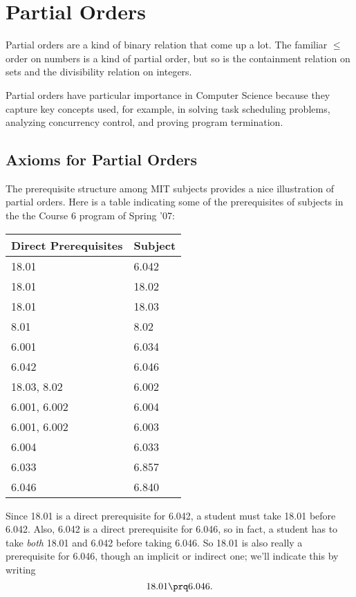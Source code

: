
\chapter{Partial Orders}


Partial orders are a kind of binary relation that come up a lot.  The
familiar $\leq$ order on numbers is a kind of partial order, but so is the
containment relation on sets and the divisibility relation on integers.

Partial orders have particular importance in Computer Science because they
capture key concepts used, for example, in solving task scheduling
problems, analyzing concurrency control, and proving program termination.

\section{Axioms for Partial Orders}

The prerequisite structure among MIT subjects provides a nice illustration
of partial orders.  Here is a table indicating some of the prerequisites of
subjects in the the Course 6 program of Spring '07:
\begin{center}
\begin{tabular}{|l|l|}
\hline
Direct Prerequisites & Subject\\ \hline
18.01 & 6.042\\ \hline
 18.01 & 18.02\\ \hline
 18.01 & 18.03\\ \hline
 8.01 & 8.02\\ \hline
 6.001 & 6.034\\ \hline
 6.042 & 6.046\\ \hline
 18.03, 8.02 & 6.002\\ \hline
 6.001, 6.002 & 6.004\\ \hline
 6.001, 6.002 & 6.003\\ \hline
 6.004 & 6.033\\ \hline
 6.033 & 6.857\\ \hline
 6.046 & 6.840\\ \hline
\end{tabular}
\end{center}

Since 18.01 is a direct prerequisite for 6.042, a student must take 18.01
before 6.042.  Also, 6.042 is a direct prerequisite for 6.046, so in fact,
a student has to take \emph{both} 18.01 and 6.042 before taking 6.046.  So
18.01 is also really a prerequisite for 6.046, though an implicit or
indirect one; we'll indicate this by writing
\[
18.01 \prq 6.046.
\]

